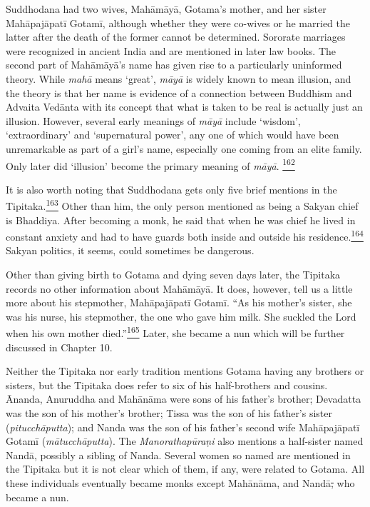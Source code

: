 Suddhodana had two wives, Mahāmāyā, Gotama's mother, and her sister
Mahāpajāpatī Gotamī, although whether they were co-wives or he married
the latter after the death of the former cannot be determined. Sororate
marriages were recognized in ancient India and are mentioned in later
law books. The second part of Mahāmāyā's name has given rise to a
particularly uninformed theory. While \emph{mahā} means `great',
\emph{māyā} is widely known to mean illusion, and the theory is that her
name is evidence of a connection between Buddhism and Advaita Vedānta
with its concept that what is taken to be real is actually just an
illusion. However, several early meanings of \emph{māyā} include
`wisdom', `extraordinary' and `supernatural power', any one of which
would have been unremarkable as part of a girl's name, especially one
coming from an elite family. Only later did `illusion' become the
primary meaning of \emph{māyā}.
\label{footprints_split_008.html_fnref162}\hyperref[footprints_split_024.htmlux5cux23fn162]{\textsuperscript{162}}

It is also worth noting that Suddhodana gets only five brief mentions in
the
Tipitaka.\label{footprints_split_008.html_fnref163}\hyperref[footprints_split_024.htmlux5cux23fn163]{\textsuperscript{163}}
Other than him, the only person mentioned as being a Sakyan chief is
Bhaddiya. After becoming a monk, he said that when he was chief he lived
in constant anxiety and had to have guards both inside and outside his
residence.\label{footprints_split_008.html_fnref164}\hyperref[footprints_split_024.htmlux5cux23fn164]{\textsuperscript{164}}
Sakyan politics, it seems, could sometimes be dangerous.

Other than giving birth to Gotama and dying seven days later, the
Tipitaka records no other information about Mahāmāyā. It does, however,
tell us a little more about his stepmother, Mahāpajāpatī Gotamī. ``As
his mother's sister, she was his nurse, his stepmother, the one who gave
him milk. She suckled the Lord when his own mother
died.''\label{footprints_split_008.html_fnref165}\hyperref[footprints_split_024.htmlux5cux23fn165]{\textsuperscript{165}}
Later, she became a nun which will be further discussed in Chapter 10.

Neither the Tipitaka nor early tradition mentions Gotama having any
brothers or sisters, but the Tipitaka does refer to six of his
half-brothers and cousins. Ānanda, Anuruddha and Mahānāma were sons of
his father's brother; Devadatta was the son of his mother's brother;
Tissa was the son of his father's sister (\emph{pitucchāputta}); and
Nanda was the son of his father's second wife Mahāpajāpatī Gotamī
(\emph{mātucchāputta}). The \emph{Manorathapūraṇi} also mentions a
half-sister named Nandā, possibly a sibling of Nanda. Several women so
named are mentioned in the Tipitaka but it is not clear which of them,
if any, were related to Gotama. All these individuals eventually became
monks except Mahānāma, and Nandā\st{,} who became a nun.

